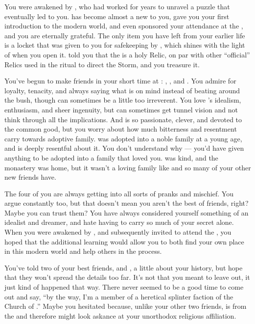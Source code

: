 \documentclass[char]{GL2020}
\begin{document}
You were awakened by \cWildCard{\full}, who had worked for years to unravel a puzzle that eventually led \cWildCard{\them} to you. \cWildCard{} has become almost a new \cWildCard{\parent} to you, gave you your first introduction to the modern world, and even sponsored your attendance at the \pSchool{}, and you are eternally grateful. The only item you have left from your earlier life is a locket that was given to you for safekeeping by \cDisneyMentor{}, which shines with the light of \cFarmGod{} when you open it. \cDisneyMentor{} told you that the \iLocket{} is a holy Relic, on par with other ``official'' Relics used in the ritual to direct the Storm, and you treasure it.

You've begun to make friends in your short time at \pSchool{}: \cPirateChild{\full}, \cTechStar{\full}, and \cAdopted{\full}. You admire \cPirateChild{} for \cPirateChild{\their} loyalty, tenacity, and always saying what is on \cPirateChild{\their} mind instead of beating around the bush, though \cPirateChild{\they} can sometimes be a little too irreverent. You love \cTechStar{}’s idealism, enthusiasm, and sheer ingenuity, but \cTechStar{\they} can sometimes get tunnel vision and not think through all the implications. And \cAdopted{} is so passionate, clever, and devoted to the common good, but you worry about how much bitterness and resentment \cAdopted{\they} carry towards \cAdopted{\their} adoptive family. \cAdopted{} was adopted into a noble family at a young age, and is deeply resentful about it. You don't understand why — you'd have given anything to be adopted into a family that loved you. \cDisneyMentor{} was kind, and the monastery was home, but it wasn't a loving family like \cAdopted{} and so many of your other new friends have.

The four of you are always getting into all sorts of pranks and mischief. You argue constantly too, but that doesn't mean you aren't the best of friends, right? Maybe you can trust them? You have always considered yourself something of an idealist and dreamer, and hate having to carry so much of your secret alone. When you were awakened by \cWildCard{}, and subsequently invited to attend the \pSchool{}, you hoped that the additional learning would allow you to both find your own place in this modern world and help others in the process.

You've told two of your best friends, \cPirateChild{} and \cTechStar{}, a little about your history, but hope that they won't spread the details too far. It's not that you meant to leave \cAdopted{} out, it just kind of happened that way. There never seemed to be a good time to come out and say, ``by the way, I'm a member of a heretical splinter faction of the Church of \cFarmGod{}.'' Maybe you hesitated because, unlike your other two friends, \cAdopted{} is from the \pFarm{}and therefore might look askance at your unorthodox religious affiliation.
\end{document}
